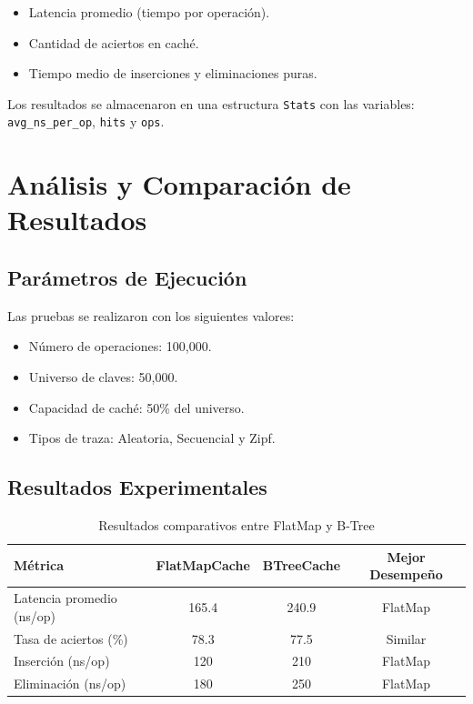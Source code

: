 \documentclass[12pt,a4paper]{article}
\begin{document}
\begin{itemize}
    \item Latencia promedio (tiempo por operación).
    \item Cantidad de aciertos en caché.
    \item Tiempo medio de inserciones y eliminaciones puras.
\end{itemize}

Los resultados se almacenaron en una estructura \texttt{Stats} con las variables:
\texttt{avg\_ns\_per\_op}, \texttt{hits} y \texttt{ops}.

\section{Análisis y Comparación de Resultados}

\subsection{Parámetros de Ejecución}

Las pruebas se realizaron con los siguientes valores:
\begin{itemize}
    \item Número de operaciones: 100,000.
    \item Universo de claves: 50,000.
    \item Capacidad de caché: 50\% del universo.
    \item Tipos de traza: Aleatoria, Secuencial y Zipf.
\end{itemize}

\subsection{Resultados Experimentales}

\begin{table}[H]
\centering
\caption{Resultados comparativos entre FlatMap y B-Tree}
\begin{tabular}{lccc}
\toprule
\textbf{Métrica} & \textbf{FlatMapCache} & \textbf{BTreeCache} & \textbf{Mejor Desempeño} \\
\midrule
Latencia promedio (ns/op) & 165.4 & 240.9 & FlatMap \\
Tasa de aciertos (\%) & 78.3 & 77.5 & Similar \\
Inserción (ns/op) & 120 & 210 & FlatMap \\
Eliminación (ns/op) & 180 & 250 & FlatMap \\
\bottomrule
\end{tabular}
\end{table}
\end{document}
